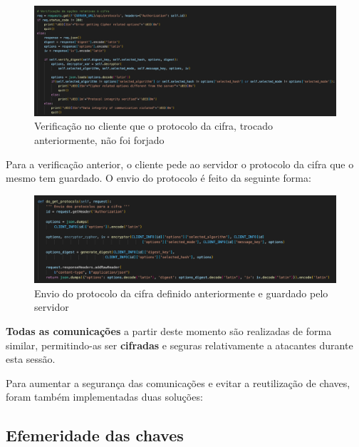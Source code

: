 \documentclass[10pt,english]{article}
\begin{document}
\begin{figure}[!h]
        \centering
        \includegraphics[width=\textwidth]{images/verify_cipher_suite.png}
        \caption{Verificação no cliente que o protocolo da cifra, trocado anteriormente, não foi forjado}
\end{figure}

\par Para a verificação anterior, o cliente pede ao servidor o protocolo da cifra que o mesmo tem guardado. O envio do protocolo é feito da seguinte forma:

\begin{figure}[!h]
        \centering
        \includegraphics[width=\textwidth]{images/get_cipher_suite.png}
        \caption{Envio do protocolo da cifra definido anteriormente e guardado pelo servidor}
\end{figure}

\par \textbf{Todas as comunicações} a partir deste momento são realizadas de forma similar, permitindo-as ser \textbf{cifradas} e seguras relativamente a atacantes durante esta sessão. 

\clearpage

\par Para aumentar a segurança das comunicações e evitar a reutilização de chaves, foram também implementadas duas soluções:

\subsection{Efemeridade das chaves}
\end{document}
